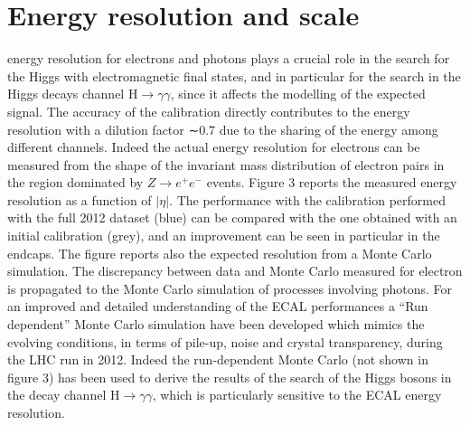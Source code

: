 \documentclass[journal]{IEEEtran}
\begin{document}
\section{Energy resolution and scale}
 energy resolution for electrons and photons plays a crucial role in the search for the Higgs with electromagnetic final states, and in particular for the search in the Higgs decays channel H$\to\gamma\gamma$, since it affects the modelling of the expected signal. The accuracy of the calibration directly contributes to the energy resolution with a dilution factor ∼0.7 due to the sharing of the energy among different channels. Indeed the actual energy resolution for electrons can be measured from the shape of the invariant mass distribution of electron pairs in the region dominated by $Z\to e^+e^-$ events. Figure 3 reports the measured energy resolution as a function of  $\vert\eta\vert$. The performance with the calibration performed with the full 2012 dataset (blue) can be compared with the one obtained with an initial calibration (grey), and an improvement can be seen in particular in the endcaps. The figure reports also the expected resolution from a Monte Carlo simulation. The discrepancy between data and Monte Carlo measured for electron is propagated to the Monte Carlo simulation of processes involving photons. For an improved and detailed understanding of the ECAL performances a ``Run dependent'' Monte Carlo simulation have been developed which mimics the evolving conditions, in terms of pile-up, noise and crystal transparency, during the LHC run in 2012. Indeed the run-dependent Monte Carlo (not shown in figure 3) has been used to derive the results of the search of the Higgs bosons in the decay channel H$\to\gamma\gamma$, which is particularly sensitive to the ECAL energy resolution.
\end{document}

